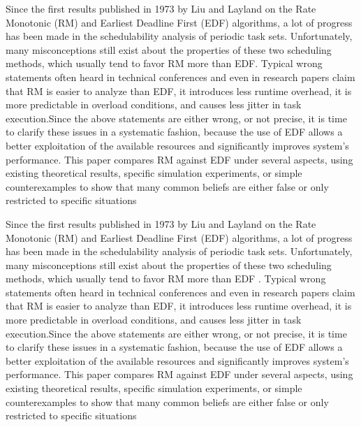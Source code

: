 \begin{frame}{\subsecname}
\tiny Since the first results published in 1973 by Liu and Layland on the Rate Monotonic (RM) and Earliest Deadline First (EDF) algorithms, a lot of progress has been made in the schedulability analysis of periodic task sets. Unfortunately, many \Large misconceptions \tiny still exist about the properties of these two scheduling methods, which usually tend to favor RM more than EDF. Typical wrong statements often heard in technical conferences and even in research papers claim that RM is easier to analyze than EDF, it introduces less runtime overhead, it is more predictable in overload conditions, and causes less jitter in task execution.Since the above statements are either wrong, or not precise, it is time to clarify these issues in a systematic fashion, because the use of EDF allows a better exploitation of the available resources and significantly improves system’s performance. This paper compares RM against EDF under several aspects, using existing theoretical results, specific simulation experiments, or simple counterexamples to show that many common beliefs are either false or only restricted to specific situations
\end{frame}
	
\begin{frame}{\subsecname}
\tiny Since the first results published in 1973 by Liu and Layland on the Rate Monotonic (RM) and Earliest Deadline First (EDF) algorithms, a lot of progress has been made in the schedulability analysis of periodic task sets. Unfortunately, many \Large misconceptions \tiny still exist about the properties of these two scheduling methods, which usually tend to \Large favor RM more than EDF \tiny. Typical wrong statements often heard in technical conferences and even in research papers claim that RM is easier to analyze than EDF, it introduces less runtime overhead, it is more predictable in overload conditions, and causes less jitter in task execution.Since the above statements are either wrong, or not precise, it is time to clarify these issues in a systematic fashion, because the use of EDF allows a better exploitation of the available resources and significantly improves system’s performance. This paper compares RM against EDF under several aspects, using existing theoretical results, specific simulation experiments, or simple counterexamples to show that many common beliefs are either false or only restricted to specific situations
\end{frame}

